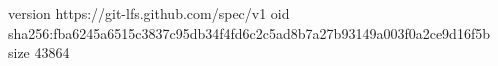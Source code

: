 version https://git-lfs.github.com/spec/v1
oid sha256:fba6245a6515c3837c95db34f4fd6c2c5ad8b7a27b93149a003f0a2ce9d16f5b
size 43864
